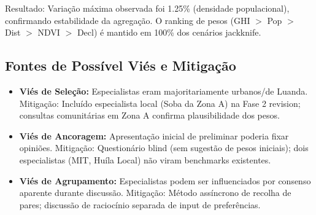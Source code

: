 \documentclass[12pt, a4paper]{article}
\begin{document}
\begin{table}[H]
\centering
\small
\caption{Sensibilidade de Pesos Agregados com Remoção Sequencial de Especialistas}
\label{tab:jackknife}
\end{table}

Resultado: Variação máxima observada foi 1.25\% (densidade populacional), confirmando estabilidade da agregação. O ranking de pesos (GHI $>$ Pop $>$ Dist $>$ NDVI $>$ Decl) é mantido em 100\% dos cenários jackknife.

\subsection{Fontes de Possível Viés e Mitigação}

\begin{itemize}
\item \textbf{Viés de Seleção:} Especialistas eram majoritariamente urbanos/de Luanda. Mitigação: Incluído especialista local (Soba da Zona A) na Fase 2 revision; consultas comunitárias em Zona A confirma plausibilidade dos pesos.

\item \textbf{Viés de Ancoragem:} Apresentação inicial de preliminar poderia fixar opiniões. Mitigação: Questionário blind (sem sugestão de pesos iniciais); dois especialistas (MIT, Huíla Local) não viram benchmarks existentes.

\item \textbf{Viés de Agrupamento:} Especialistas podem ser influenciados por consenso aparente durante discussão. Mitigação: Método assíncrono de recolha de pares; discussão de raciocínio separada de input de preferências.
\end{itemize}
\end{document}
